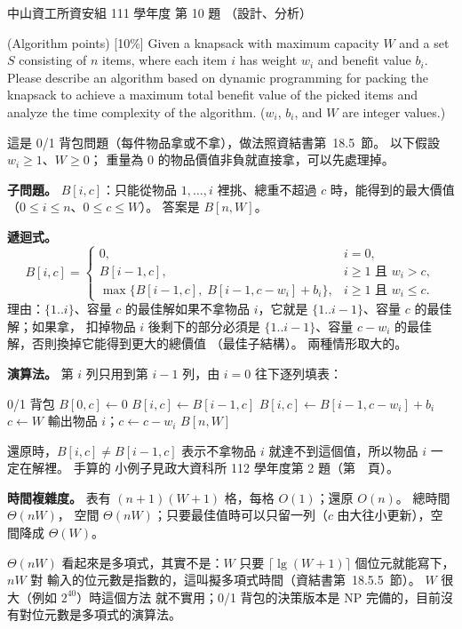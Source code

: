 \begin{pastexam}[label={px:nsysu-111-dmalg-07}]{中山資工所資安組 111 學年度 第 10 題}
（設計、分析）

(Algorithm points) {[10\%]} Given a knapsack with maximum capacity $W$ and a set $S$ consisting of $n$
items, where each item $i$ has weight $w_i$ and benefit value $b_i$. Please describe an algorithm based
on dynamic programming for packing the knapsack to achieve a maximum total benefit value of the picked
items and analyze the time complexity of the algorithm. ($w_i$, $b_i$, and $W$ are integer values.)
\end{pastexam}

\begin{pastsoln}
這是 0/1 背包問題（每件物品拿或不拿），做法照資結書第~18.5~節。 以下假設 $w_i \ge 1$、$W \ge 0$；
重量為 $0$ 的物品價值非負就直接拿，可以先處理掉。

\textbf{子問題。} $B[i, c]$：只能從物品 $1, \ldots, i$ 裡挑、總重不超過 $c$ 時，能得到的最大價值
（$0 \le i \le n$、$0 \le c \le W$）。 答案是 $B[n, W]$。

\textbf{遞迴式。}
\[
B[i, c] =
\begin{cases}
0, & i = 0, \\
B[i-1, c], & i \ge 1 \text{ 且 } w_i > c, \\
\max\bigl\{B[i-1, c],\; B[i-1, c - w_i] + b_i\bigr\}, & i \ge 1 \text{ 且 } w_i \le c.
\end{cases}
\]
理由：$\{1..i\}$、容量 $c$ 的最佳解如果不拿物品 $i$，它就是 $\{1..i-1\}$、容量 $c$ 的最佳解；如果拿，
扣掉物品 $i$ 後剩下的部分必須是 $\{1..i-1\}$、容量 $c - w_i$ 的最佳解，否則換掉它能得到更大的總價值
（最佳子結構）。 兩種情形取大的。

\textbf{演算法。} 第 $i$ 列只用到第 $i-1$ 列，由 $i = 0$ 往下逐列填表：
\begin{pseudo}[unbreakable]{0/1 背包}
        \State $B[0, c] \gets 0$
    \EndFor
            \State $B[i, c] \gets B[i - 1, c]$
                \State $B[i, c] \gets B[i - 1, c - w_i] + b_i$
            \EndIf
        \EndFor
    \EndFor
    \State $c \gets W$ 
            \State 輸出物品 $i$；$c \gets c - w_i$
        \EndIf
    \EndFor
    \State \Return $B[n, W]$
\EndFunction
\end{pseudo}
還原時，$B[i, c] \ne B[i-1, c]$ 表示不拿物品 $i$ 就達不到這個值，所以物品 $i$ 一定在解裡。 手算的
小例子見政大資科所 112 學年度第 2 題（第~\pageref{px:nccu-112-dsa-02}~頁）。

\textbf{時間複雜度。} 表有 $(n+1)(W+1)$ 格，每格 $O(1)$；還原 $O(n)$。 總時間 $\Theta(nW)$，
空間 $\Theta(nW)$；只要最佳值時可以只留一列（$c$ 由大往小更新），空間降成 $\Theta(W)$。

$\Theta(nW)$ 看起來是多項式，其實不是：$W$ 只要 $\lceil \lg (W+1) \rceil$ 個位元就能寫下，$nW$ 對
輸入的位元數是指數的，這叫擬多項式時間（資結書第~18.5.5~節）。 $W$ 很大（例如 $2^{40}$）時這個方法
就不實用；0/1 背包的決策版本是 NP 完備的，目前沒有對位元數是多項式的演算法。
\end{pastsoln}
